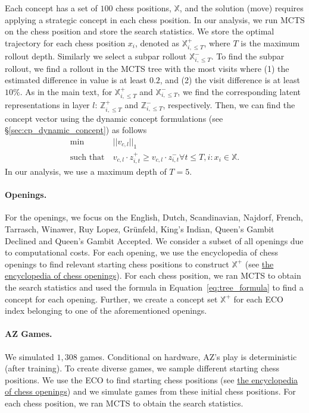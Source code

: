 \documentclass{article}
\def\Xset{\mathbb{X}}
\def\Zset{\mathbb{Z}}
\def\vcld{v_{c,l}\cdot}
\def\vcl{v_{c,l}}
\def\st{\textrm{such that}}
\begin{document}
Each concept has a set of $100$ chess positions, $\Xset$, and the solution (move) requires applying a strategic concept in each chess position. 
In our analysis, we run  MCTS on the chess position and store the search statistics. 
We store the optimal trajectory for each chess position $x_i$, denoted as $\Xset^{+}_{i, \leq T}$, where $T$ is the maximum rollout depth.  
Similarly we select a subpar rollout $\Xset^{-}_{i, \leq T}$. To find the subpar rollout, we find a rollout in the MCTS tree with the most visits where (1) the estimated difference in value is at least $0.2$, and (2) the visit difference is at least $10 \%$. 
As in the main text, for $\Xset^{+}_{i, \leq T}$ and $\Xset^{-}_{i, \leq T}$, we find the corresponding latent representations in layer $l$: $\Zset^{+}_{i, \leq T}$ and $\Zset^{-}_{i, \leq T}$, respectively.
Then, we can find the concept vector using the dynamic concept formulations (see \S\ref{sec:cp_dynamic_concept}) as follows
\begin{align}
 \min \  & ||\vcl||_1 \\
 \st \ & \vcld z^{+}_{i,t} \geq \vcld z^{-}_{i,t} \forall t \leq T, i: x_i \in \Xset.
\end{align}
In our analysis, we use a maximum depth of $T=5$.

\paragraph{Openings.}
For the openings, we focus on the English, Dutch, Scandinavian, Najdorf, French, Tarrasch, Winawer, Ruy Lopez, Grünfeld, King's Indian, Queen's Gambit Declined and Queen's Gambit Accepted.
We consider a subset of all openings due to computational costs. 
For each opening, we use the encyclopedia of chess openings to find relevant starting chess positions to construct $\Xset^{+}$
(see \href{https://github.com/lichess-org/chess-openings }{the encyclopedia of chess openings}).  
For each chess position, we ran MCTS to obtain the search statistics and used the formula in Equation~\ref{eq:tree_formula} to find a concept for each opening.
Further, we create a concept set $\Xset^{+}$ for each ECO index belonging to one of the aforementioned openings.

\paragraph{AZ Games.}
We simulated $1,308$ games. Conditional on hardware, AZ's play is deterministic (after training).  To create diverse games, we sample different starting chess positions. We use the ECO to find starting chess positions
(see \href{https://github.com/lichess-org/chess-openings }{the encyclopedia of chess openings}) and we simulate games from these initial chess positions.  
For each chess position, we ran MCTS to obtain the search statistics.  
\end{document}
